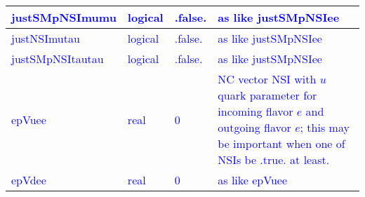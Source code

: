 \documentclass{article}
\begin{document}
\begin{longtable}{llll}
\midrule
\textcolor{blue}{justSMpNSImumu} & \begin{minipage}[t]{2cm}\textcolor{blue}{logical}\end{minipage} & \begin{minipage}[t]{2cm}\textcolor{blue}{.false.}\end{minipage} & \begin{minipage}[t]{12cm}\textcolor{blue}{as like justSMpNSIee}\end{minipage}\\*
\midrule
\textcolor{blue}{justNSImutau} & \begin{minipage}[t]{2cm}\textcolor{blue}{logical}\end{minipage} & \begin{minipage}[t]{2cm}\textcolor{blue}{.false.}\end{minipage} & \begin{minipage}[t]{12cm}\textcolor{blue}{as like justSMpNSIee}\end{minipage}\\*
\midrule
\textcolor{blue}{justSMpNSItautau} & \begin{minipage}[t]{2cm}\textcolor{blue}{logical}\end{minipage} & \begin{minipage}[t]{2cm}\textcolor{blue}{.false.}\end{minipage} & \begin{minipage}[t]{12cm}\textcolor{blue}{as like justSMpNSIee}\end{minipage}\\*
\midrule
\textcolor{blue}{epVuee} & \begin{minipage}[t]{2cm}\textcolor{blue}{real}\end{minipage} & \begin{minipage}[t]{2cm}\textcolor{blue}{0}\end{minipage} & \begin{minipage}[t]{12cm}\textcolor{blue}{NC vector NSI with $u$ quark parameter for incoming flavor $e$ and outgoing flavor $e$; this may be important when one of NSIs be .true. at least.}\end{minipage}\\*
\midrule
\textcolor{blue}{epVdee} & \begin{minipage}[t]{2cm}\textcolor{blue}{real}\end{minipage} & \begin{minipage}[t]{2cm}\textcolor{blue}{0}\end{minipage} & \begin{minipage}[t]{12cm}\textcolor{blue}{as like epVuee}\end{minipage}\\*

\end{longtable}
\end{document}
